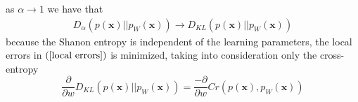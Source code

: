 as $\alpha\rightarrow 1$ we have that
\begin{align*}
	D_{\alpha}\left( p\left( \mathbf{x}\right) ||p_{W}\left( \mathbf{x}\right) \right)\rightarrow D_{KL}\left( p\left( \mathbf{x}\right) ||p_{W}\left( \mathbf{x}\right) \right)
\end{align*}
because the Shanon entropy is independent of the learning parameters, the local errors in $\left(\ref{local errors}\right) $ is minimized, taking into consideration only the cross-entropy
\begin{equation}\label{cross entropy}
	\frac{\partial}{\partial w}D_{KL}\left( p\left( \mathbf{x}\right) ||p_{W}\left( \mathbf{x}\right) \right)=\frac{-\partial}{\partial w}Cr\left( p\left( \mathbf{x}\right) ,p_{W}\left( \mathbf{x}\right) \right) 
\end{equation}

